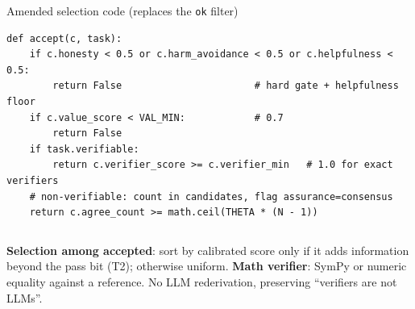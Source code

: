 \documentclass[aspectratio=169,10pt]{beamer}
\begin{document}
\begin{frame}[fragile]{Amended selection code (replaces the \texttt{ok} filter)}
\begin{lstlisting}
def accept(c, task):
    if c.honesty < 0.5 or c.harm_avoidance < 0.5 or c.helpfulness < 0.5:
        return False                       # hard gate + helpfulness floor
    if c.value_score < VAL_MIN:            # 0.7
        return False
    if task.verifiable:
        return c.verifier_score >= c.verifier_min   # 1.0 for exact verifiers
    # non-verifiable: count in candidates, flag assurance=consensus
    return c.agree_count >= math.ceil(THETA * (N - 1))
\end{lstlisting}
\begin{columns}[T]
\scriptsize
\textbf{Selection among accepted}: sort by calibrated score only if it adds information beyond the pass bit (T2); otherwise uniform.
\scriptsize
\textbf{Math verifier}: SymPy or numeric equality against a reference. No LLM rederivation, preserving ``verifiers are not LLMs''.
\end{columns}
\end{frame}
\end{document}
